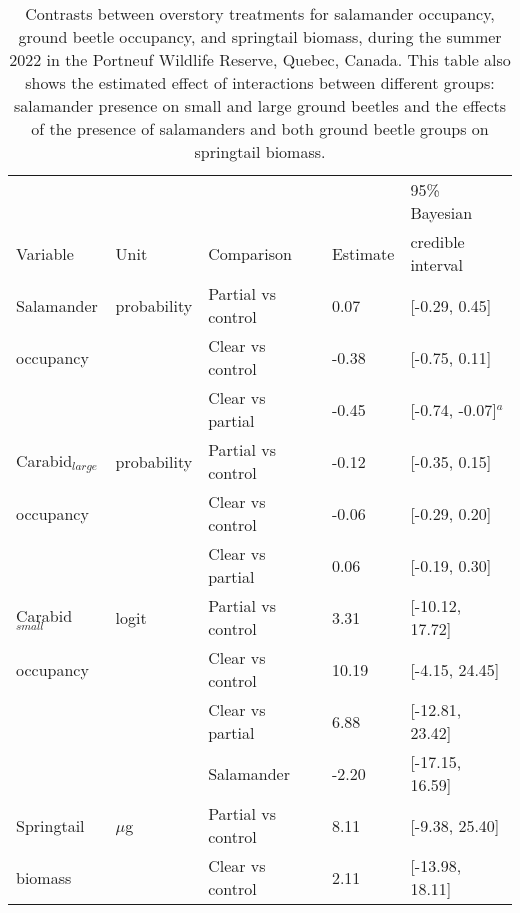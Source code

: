 \begin{table}[ht]
  \centering
  \caption[Contrasts between overstory treatments for salamander occupancy, ground beetle occupancy, and springtail biomass.]
  {Contrasts between overstory treatments for salamander occupancy, ground beetle occupancy, and springtail biomass, during the summer 2022 in the Portneuf Wildlife Reserve, Quebec, Canada. 
  This table also shows the estimated effect of interactions between different groups: salamander presence on small and large ground beetles and the effects of the presence of salamanders and both ground beetle groups on springtail biomass.}
  \label{tab:overstorysp}
  \begin{tabular}{lllll} 
      \hline
      &&&&95\% Bayesian \\
      Variable&Unit& Comparison & Estimate &  credible interval \\ [0.5ex] 
      \hline     
      Salamander           &probability& Partial vs control & \hspace{1mm}0.07 & [-0.29, 0.45] \\ 
      occupancy       && Clear vs control  & -0.38 & [-0.75, 0.11] \\ 
                          && Clear vs partial  & -0.45 & [-0.74, -0.07]$^{a}$ \\       
      Carabid$_{large}$ &probability& Partial vs control & -0.12 & [-0.35, 0.15] \\
      occupancy       && Clear vs control  & -0.06 & [-0.29, 0.20] \\ 
                          && Clear vs partial  & \hspace{1mm}0.06 & [-0.19, 0.30] \\ 
      Carabid$_{small}$    &logit& Partial vs control & \hspace{1mm}3.31 & [-10.12, 17.72] \\
      occupancy             && Clear vs control  & \hspace{1mm}10.19 & [-4.15, 24.45] \\ 
                          && Clear vs partial  & \hspace{1mm}6.88 & [-12.81, 23.42] \\  
                          && Salamander        & -2.20 & [-17.15, 16.59] \\  
      Springtail          &$\mu$g& Partial vs control & \hspace{1mm}8.11 & [-9.38, 25.40] \\
      biomass             && Clear vs control  & \hspace{1mm}2.11 & [-13.98, 18.11] \\ 

\end{tabular}
\end{table}
